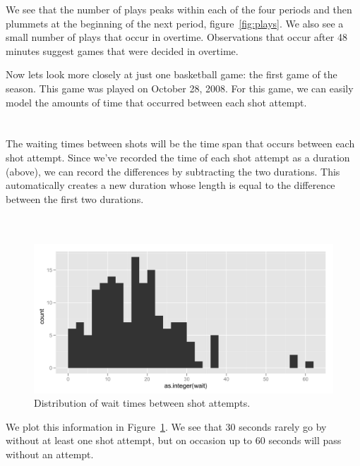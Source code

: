 \documentclass[article]{jss}
\begin{document}
We see that the number of plays peaks within each of the four periods and then plummets at the beginning of the next period, figure~\ref{fig:plays}. We also see a small number of plays that occur in overtime. Observations that occur after 48 minutes suggest games that were decided in overtime.

Now lets look more closely at just one basketball game: the first game of the season. This game was played on October 28, 2008. For this game, we can easily model the amounts of time that occurred between each shot attempt.\\

\\
\\

The waiting times between shots will be the time span that occurs between each shot attempt. Since we've recorded the time of each shot attempt as a duration (above), we can record the differences by subtracting the two durations. This automatically creates a new duration whose length is equal to the difference between the first two durations.\\

\\
\\

\begin{figure}[htpb]
  \centering
  \includegraphics[width=\textwidth]{wait-histogram.png}        
  \caption{Distribution of wait times between shot attempts.}
  \label{fig:waits}
\end{figure}

We plot this information in Figure~\ref{fig:waits}. We see that 30 seconds rarely go by without at least one shot attempt, but on occasion up to 60 seconds will pass without an attempt.
\end{document}
